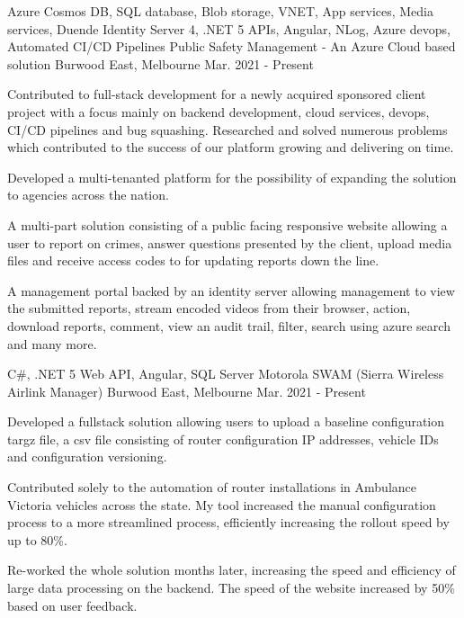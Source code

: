 

\begin{cventries}

  \cventry
    {Azure Cosmos DB, SQL database, Blob storage, VNET, App services, Media services, Duende Identity Server 4, .NET 5 APIs, Angular, NLog, Azure devops, Automated CI/CD Pipelines}
    {Public Safety Management - An Azure Cloud based solution}
    {Burwood East, Melbourne}
    {Mar. 2021 - Present}
    {
      \begin{cvitems}
        \item {Contributed to full-stack development for a newly acquired sponsored client project with a focus mainly on backend development, cloud services, devops, CI/CD pipelines and bug squashing. Researched and solved numerous problems which contributed to the success of our platform growing and delivering on time.}
        \item {Developed a multi-tenanted platform for the possibility of expanding the solution to agencies across the nation.}
        \item {A multi-part solution consisting of a public facing responsive website allowing a user to report on crimes, answer questions presented by the client, upload media files  and receive access codes to for updating reports down the line.}
        \item {A management portal backed by an identity server allowing management to view the submitted reports, stream encoded videos from their browser, action, download reports, comment, view an audit trail, filter, search using azure search and many more.}
      \end{cvitems}
    }
  \cventry
    {C\#, .NET 5 Web API, Angular, SQL Server}
    {Motorola SWAM (Sierra Wireless Airlink Manager)}
    {Burwood East, Melbourne}
    {Mar. 2021 - Present}
    {
      \begin{cvitems}
        \item {Developed a fullstack solution allowing users to upload a baseline configuration targz file, a csv file consisting of router configuration IP addresses, vehicle IDs and configuration versioning.}
        \item {Contributed solely to the automation of router installations in Ambulance Victoria vehicles across the state. My tool increased the manual configuration process to a more streamlined process, efficiently increasing the rollout speed by up to 80\%.}
        \item {Re-worked the whole solution months later, increasing the speed and efficiency of large data processing on the backend. The speed of the website increased by 50\% based on user feedback.}

\end{cvitems}}
\end{cventries}
